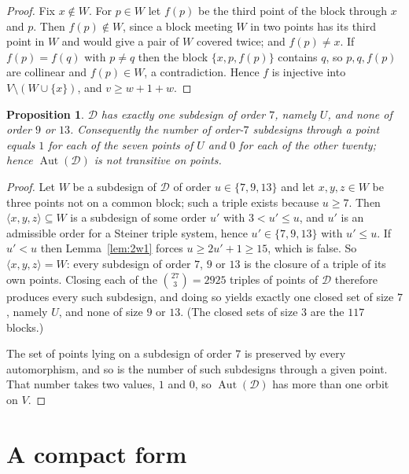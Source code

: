 \documentclass[11pt]{amsart}
\newtheorem{proposition}[theorem]{Proposition}
\theoremstyle{remark}
\begin{document}
\begin{proof}
Fix $x\notin W$. For $p\in W$ let $f(p)$ be the third point of the block through
$x$ and $p$. Then $f(p)\notin W$, since a block meeting $W$ in two points has
its third point in $W$ and would give a pair of $W$ covered twice; and
$f(p)\ne x$. If $f(p)=f(q)$ with $p\ne q$ then the block $\{x,p,f(p)\}$ contains
$q$, so $p,q,f(p)$ are collinear and $f(p)\in W$, a contradiction. Hence $f$ is
injective into $V\setminus(W\cup\{x\})$, and $v\ge w+1+w$.
\end{proof}

\begin{proposition}\label{prop:inv}
$\mathcal D$ has exactly one subdesign of order $7$, namely $U$, and none of
order $9$ or $13$. Consequently the number of order-$7$ subdesigns through a
point equals $1$ for each of the seven points of $U$ and $0$ for each of the
other twenty; hence $\operatorname{Aut}(\mathcal D)$ is not transitive on points.
\end{proposition}

\begin{proof}
Let $W$ be a subdesign of $\mathcal D$ of order $u\in\{7,9,13\}$ and let
$x,y,z\in W$ be three points not on a common block; such a triple exists because
$u\ge 7$. Then $\langle x,y,z\rangle\subseteq W$ is a subdesign of some order
$u'$ with $3<u'\le u$, and $u'$ is an admissible order for a Steiner triple
system, hence $u'\in\{7,9,13\}$ with $u'\le u$. If $u'<u$ then
Lemma~\ref{lem:2w1} forces $u\ge 2u'+1\ge 15$, which is false. So
$\langle x,y,z\rangle=W$: every subdesign of order $7$, $9$ or $13$ is the
closure of a triple of its own points. Closing each of the
$\binom{27}{3}=2925$ triples of points of $\mathcal D$ therefore produces every
such subdesign, and doing so yields exactly one closed set of size $7$, namely
$U$, and none of size $9$ or $13$. (The closed sets of size $3$ are the $117$
blocks.)

The set of points lying on a subdesign of order $7$ is preserved by every
automorphism, and so is the number of such subdesigns through a given point.
That number takes two values, $1$ and $0$, so $\operatorname{Aut}(\mathcal D)$
has more than one orbit on $V$.
\end{proof}

\section{A compact form}
\end{document}
